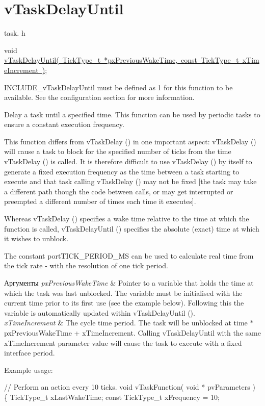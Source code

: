 \hypertarget{group__v_task_delay_until}{}\section{v\+Task\+Delay\+Until}
\label{group__v_task_delay_until}
task. h 
\begin{DoxyPre}void \mbox{\hyperlink{task_8h_a067da3e949e248096ec6c01f9cb75a47}{vTaskDelayUntil( TickType\_t *pxPreviousWakeTime, const TickType\_t xTimeIncrement )}};\end{DoxyPre}


I\+N\+C\+L\+U\+D\+E\+\_\+v\+Task\+Delay\+Until must be defined as 1 for this function to be available. See the configuration section for more information.

Delay a task until a specified time. This function can be used by periodic tasks to ensure a constant execution frequency.

This function differs from v\+Task\+Delay () in one important aspect\+: v\+Task\+Delay () will cause a task to block for the specified number of ticks from the time v\+Task\+Delay () is called. It is therefore difficult to use v\+Task\+Delay () by itself to generate a fixed execution frequency as the time between a task starting to execute and that task calling v\+Task\+Delay () may not be fixed \mbox{[}the task may take a different path though the code between calls, or may get interrupted or preempted a different number of times each time it executes\mbox{]}.

Whereas v\+Task\+Delay () specifies a wake time relative to the time at which the function is called, v\+Task\+Delay\+Until () specifies the absolute (exact) time at which it wishes to unblock.

The constant port\+T\+I\+C\+K\+\_\+\+P\+E\+R\+I\+O\+D\+\_\+\+MS can be used to calculate real time from the tick rate -\/ with the resolution of one tick period.


\begin{DoxyParams}{Аргументы}
{\em px\+Previous\+Wake\+Time} & Pointer to a variable that holds the time at which the task was last unblocked. The variable must be initialised with the current time prior to its first use (see the example below). Following this the variable is automatically updated within v\+Task\+Delay\+Until ().\\
\hline
{\em x\+Time\+Increment} & The cycle time period. The task will be unblocked at time $\ast$px\+Previous\+Wake\+Time + x\+Time\+Increment. Calling v\+Task\+Delay\+Until with the same x\+Time\+Increment parameter value will cause the task to execute with a fixed interface period.\\
\hline
\end{DoxyParams}
Example usage\+: 
\begin{DoxyPre}
// Perform an action every 10 ticks.
void vTaskFunction( void * pvParameters )
\{
TickType\_t xLastWakeTime;
const TickType\_t xFrequency = 10;\end{DoxyPre}



